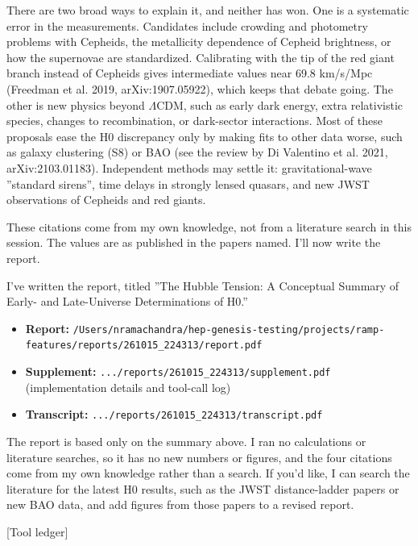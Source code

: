 \documentclass[11pt,a4paper]{article}
\begin{document}
There are two broad ways to explain it, and neither has won. One is a systematic error in the measurements. Candidates include crowding and photometry problems with Cepheids, the metallicity dependence of Cepheid brightness, or how the supernovae are standardized. Calibrating with the tip of the red giant branch instead of Cepheids gives intermediate values near 69.8 km/s/Mpc (Freedman et al. 2019, arXiv:1907.05922), which keeps that debate going. The other is new physics beyond $\Lambda$CDM, such as early dark energy, extra relativistic species, changes to recombination, or dark-sector interactions. Most of these proposals ease the H0 discrepancy only by making fits to other data worse, such as galaxy clustering (S8) or BAO (see the review by Di Valentino et al. 2021, arXiv:2103.01183). Independent methods may settle it: gravitational-wave ''standard sirens'', time delays in strongly lensed quasars, and new JWST observations of Cepheids and red giants.

These citations come from my own knowledge, not from a literature search in this session. The values are as published in the papers named. I'll now write the report.

I've written the report, titled ''The Hubble Tension: A Conceptual Summary of Early- and Late-Universe Determinations of H0.''

\begin{itemize}
  \item \textbf{Report:} \texttt{/\allowbreak{}Users/\allowbreak{}nramachandra/\allowbreak{}hep-genesis-testing/\allowbreak{}projects/\allowbreak{}ramp-features/\allowbreak{}reports/\allowbreak{}261015\_\allowbreak{}224313/\allowbreak{}report.pdf}
  \item \textbf{Supplement:} \texttt{.../\allowbreak{}reports/\allowbreak{}261015\_\allowbreak{}224313/\allowbreak{}supplement.pdf} (implementation details and tool-call log)
  \item \textbf{Transcript:} \texttt{.../\allowbreak{}reports/\allowbreak{}261015\_\allowbreak{}224313/\allowbreak{}transcript.pdf}
\end{itemize}
The report is based only on the summary above. I ran no calculations or literature searches, so it has no new numbers or figures, and the four citations come from my own knowledge rather than a search. If you'd like, I can search the literature for the latest H0 results, such as the JWST distance-ladder papers or new BAO data, and add figures from those papers to a revised report.

[Tool ledger]
\end{document}
